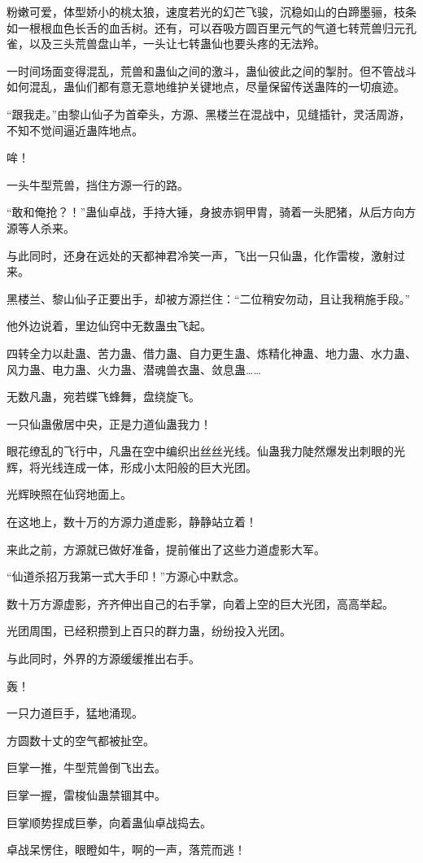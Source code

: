\begin{this_body}
粉嫩可爱，体型娇小的桃太狼，速度若光的幻芒飞骏，沉稳如山的白蹄墨骊，枝条如一根根血色长舌的血舌树。还有，可以吞吸方圆百里元气的气道七转荒兽归元孔雀，以及三头荒兽盘山羊，一头让七转蛊仙也要头疼的无法羚。

一时间场面变得混乱，荒兽和蛊仙之间的激斗，蛊仙彼此之间的掣肘。但不管战斗如何混乱，蛊仙们都有意无意地维护关键地点，尽量保留传送蛊阵的一切痕迹。

“跟我走。”由黎山仙子为首牵头，方源、黑楼兰在混战中，见缝插针，灵活周游，不知不觉间逼近蛊阵地点。

哞！

一头牛型荒兽，挡住方源一行的路。

“敢和俺抢？！”蛊仙卓战，手持大锤，身披赤铜甲胄，骑着一头肥猪，从后方向方源等人杀来。

与此同时，还身在远处的天都神君冷笑一声，飞出一只仙蛊，化作雷梭，激射过来。

黑楼兰、黎山仙子正要出手，却被方源拦住：“二位稍安勿动，且让我稍施手段。”

他外边说着，里边仙窍中无数蛊虫飞起。

四转全力以赴蛊、苦力蛊、借力蛊、自力更生蛊、炼精化神蛊、地力蛊、水力蛊、风力蛊、电力蛊、火力蛊、潜魂兽衣蛊、敛息蛊……

无数凡蛊，宛若蝶飞蜂舞，盘绕旋飞。

一只仙蛊傲居中央，正是力道仙蛊我力！

眼花缭乱的飞行中，凡蛊在空中编织出丝丝光线。仙蛊我力陡然爆发出刺眼的光辉，将光线连成一体，形成小太阳般的巨大光团。

光辉映照在仙窍地面上。

在这地上，数十万的方源力道虚影，静静站立着！

来此之前，方源就已做好准备，提前催出了这些力道虚影大军。

“仙道杀招万我第一式大手印！”方源心中默念。

数十万方源虚影，齐齐伸出自己的右手掌，向着上空的巨大光团，高高举起。

光团周围，已经积攒到上百只的群力蛊，纷纷投入光团。

与此同时，外界的方源缓缓推出右手。

轰！

一只力道巨手，猛地涌现。

方圆数十丈的空气都被扯空。

巨掌一推，牛型荒兽倒飞出去。

巨掌一握，雷梭仙蛊禁锢其中。

巨掌顺势捏成巨拳，向着蛊仙卓战捣去。

卓战呆愣住，眼瞪如牛，啊的一声，落荒而逃！

\end{this_body}

